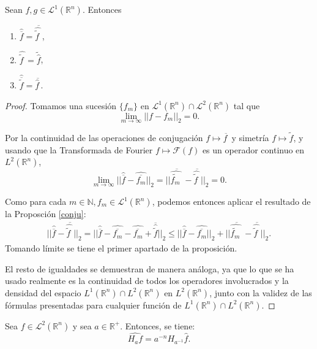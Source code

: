 \begin{proposicion}\label{conjugado}
Sean $f,g \in \mathscr{L}^1(\mathbb{R}^n)$. Entonces 

\begin{enumerate}
    \item $\widehat{\overline{f}} = \overline{\widehat{\widetilde{f}\,}\,}$,
    \item $\widehat{\widetilde{f}\,} = \widetilde{\widehat{f}}$,
    \item $\widehat{\overline{\widetilde{f}}} = \overline{\widehat{f}\,}$.
\end{enumerate}
\end{proposicion}

\begin{proof}
    \noindent Tomamos una sucesión $\{f_m\}$ en  $\mathscr{L}^1(\mathbb{R}^n)\cap\mathscr{L}^2(\mathbb{R}^n)$ tal que
\begin{equation}
    \lim_{m \rightarrow \infty}||f-f_m||_2 =0.
\end{equation}


\noindent Por la continuidad de las operaciones de conjugación $ f \mapsto \overline{f\,}$ y simetría $f \mapsto \widetilde{f}$, y usando que la Transformada de Fourier $f \mapsto \mathscr{F}(f)$ es un operador continuo en $L^2(\mathbb{R}^n)$,
\begin{equation}
    \lim_{m \rightarrow \infty}||\widehat{\overline{f}} -\widehat{\overline{f_m}}||_2 =  ||\overline{\widehat{\widetilde{f_m}\,}\,}-\overline{\widehat{\widetilde{f}\,}\,}||_2 =0.
\end{equation}

\noindent Como para cada $m \in \mathbb{N}, f_m \in \mathscr{L}^1(\mathbb{R}^n)$, podemos entonces aplicar el resultado de la Proposción \ref{conju}:
\begin{align}
||\widehat{\overline{f}} - \overline{\widehat{\widetilde{f}\,}\,}||_2 
= ||\widehat{\overline{f}} -\widehat{\overline{f_m}}-\widehat{\overline{f_m}}+\overline{\widehat{\widetilde{f}}}||_2 
\leq ||\widehat{\overline{f}} -\widehat{\overline{f_m}}||_2+||\overline{\widehat{\widetilde{f_m}\,}\,}-\overline{\widehat{\widetilde{f}\,}\,}||_2.
\end{align}
Tomando límite se tiene el primer apartado de la proposición. 

\noindent El resto de igualdades se demuestran de manera análoga, ya que lo que se ha usado realmente es la continuidad de todos los operadores involucrados y la densidad del espacio $L^1(\mathbb{R}^n) \cap L^2(\mathbb{R}^n)$ en $ L^2(\mathbb{R}^n)$, junto con la validez de las fórmulas presentadas para cualquier función de $L^1(\mathbb{R}^n) \cap L^2(\mathbb{R}^n)$.

\end{proof}
\begin{proposicion}
    Sea $f \in \mathscr{L}^2(\mathbb{R}^n)$ y sea $a \in \mathbb{R}^+$. Entonces, se tiene:
    \begin{equation}
        \widehat{H_af} = a^{-n}H_{a^{-1}}\widehat{f}.
    \end{equation}
\end{proposicion}

